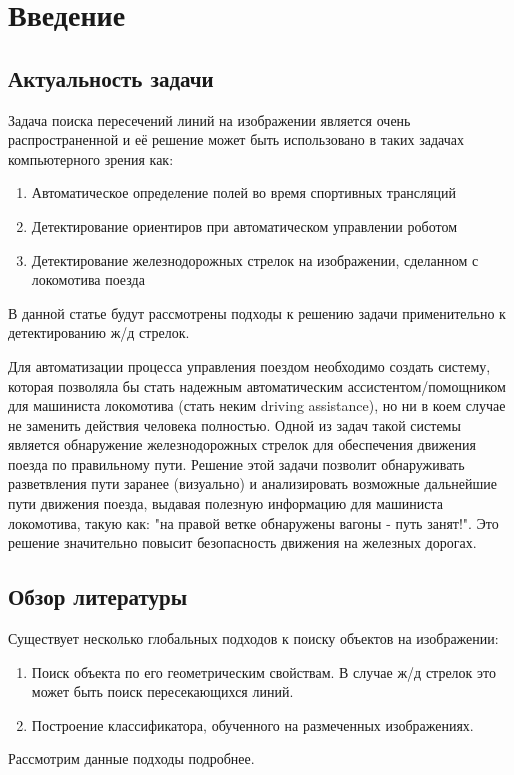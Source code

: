 \section{Введение}
\subsection{Актуальность задачи}
Задача поиска пересечений линий на изображении является очень распространенной и её решение может быть использовано в таких задачах компьютерного зрения как:
\begin{enumerate}
	\item Автоматическое определение полей во время спортивных трансляций
	\item Детектирование ориентиров при автоматическом управлении роботом
	\item Детектирование железнодорожных стрелок на изображении, сделанном с локомотива поезда
\end{enumerate} 


В данной статье будут рассмотрены подходы к решению задачи применительно к детектированию ж/д стрелок.


Для автоматизации процесса управления поездом необходимо создать систему, которая позволяла бы стать надежным автоматическим ассистентом/помощником для машиниста локомотива (стать неким driving assistance), но ни в коем случае не заменить действия человека полностью. 
Одной из задач такой системы является обнаружение железнодорожных стрелок для обеспечения движения поезда по правильному пути.
Решение этой задачи позволит обнаруживать разветвления пути заранее (визуально) и анализировать возможные дальнейшие пути движения поезда, выдавая полезную информацию для машиниста локомотива, такую как: "на правой ветке обнаружены вагоны - путь занят!". Это решение значительно повысит безопасность движения на железных дорогах.

\subsection{Обзор литературы}
Существует несколько глобальных подходов к поиску объектов на изображении:
\begin{enumerate}
	\item Поиск объекта по его геометрическим свойствам. В случае ж/д стрелок это может быть поиск пересекающихся линий.
	\item Построение классификатора, обученного на размеченных изображениях.
\end{enumerate}
Рассмотрим данные подходы подробнее.
